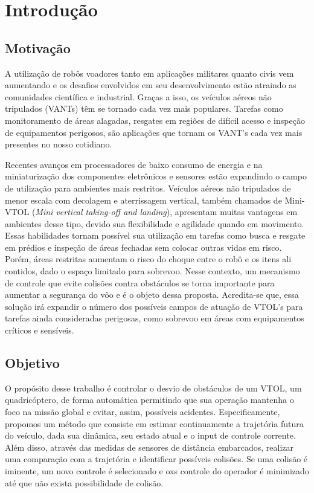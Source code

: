 \documentclass[a4paper, 12pt]{article}
\begin{document}
\newpage

\section{Introdução}

\subsection{Motivação}

A utilização de robôs voadores tanto em aplicações militares quanto civis vem aumentando e os desafios envolvidos em seu desenvolvimento estão atraindo as comunidades científica e industrial. Graças a isso, os veículos aéreos não tripulados (VANTs) têm se tornado cada vez mais populares. Tarefas como monitoramento de áreas alagadas, resgates em regiões de difícil acesso e inspeção de equipamentos perigosos, são aplicações que tornam os VANT's cada vez mais presentes no nosso cotidiano. 

Recentes avanços em processadores de baixo consumo de energia e na miniaturização dos componentes eletrônicos e sensores estão expandindo o campo de utilização para ambientes mais restritos. Veículos aéreos não tripulados de menor escala com decolagem e aterrissagem vertical, também chamados de Mini-VTOL (\textit{Mini vertical taking-off and landing}), apresentam muitas vantagens em ambientes desse tipo, devido sua flexibilidade e agilidade quando em movimento. Essas habilidades tornam possível sua utilização em tarefas como busca e resgate em prédios e inspeção de áreas fechadas sem colocar outras vidas em risco. Porém, áreas restritas aumentam o risco do choque entre o robô e os itens ali contidos, dado o espaço limitado para sobrevoo. Nesse contexto, um mecanismo de controle que evite colisões contra obstáculos se torna importante para aumentar a segurança do vôo e é o objeto dessa proposta. Acredita-se que, essa solução irá expandir o número dos possíveis campos de atuação de VTOL's para tarefas ainda consideradas perigosas, como sobrevoo em áreas com equipamentos críticos e sensíveis.



\subsection{Objetivo}

O propósito desse trabalho é controlar o desvio de obstáculos de um VTOL, um quadricóptero, de forma automática permitindo que sua operação mantenha o foco na missão global e evitar, assim, possíveis acidentes. Especificamente, propomos um método que consiste em estimar continuamente a trajetória futura do veículo, dada sua dinâmica, seu estado atual e o input de controle corrente. Além disso, através das medidas de sensores de distância embarcados, realizar uma comparação com a trajetória e identificar possíveis colisões. Se uma colisão é iminente, um novo controle é selecionado e oxs controle do operador é minimizado até que não exista possibilidade de colisão.
\end{document}
